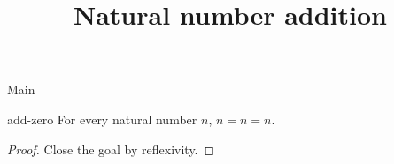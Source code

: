 \begin{lexlean}{Main}
\title{Natural number addition}

\begin{theorem}{add-zero}
\noaxioms
For every natural number \(n\), \(n = n = n\).
\begin{proof}
Close the goal by reflexivity.
\end{proof}
\end{theorem}
\end{lexlean}
